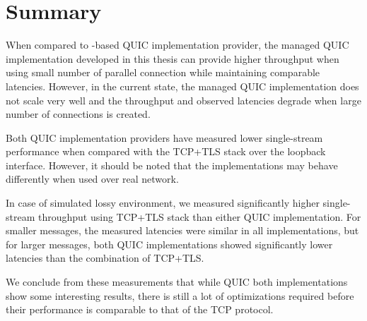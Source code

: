\section{Summary}


When compared to \libmsquic{}-based QUIC implementation provider, the managed QUIC implementation
developed in this thesis can provide higher throughput when using small number of parallel
connection while maintaining comparable latencies. However, in the current state, the managed QUIC
implementation does not scale very well and the throughput and observed latencies degrade when large
number of connections is created.

Both QUIC implementation providers have measured lower single-stream performance when compared with
the TCP+TLS stack over the loopback interface. However, it should be noted that the implementations
may behave differently when used over real network.

In case of simulated lossy environment, we measured significantly higher single-stream throughput
using TCP+TLS stack than either QUIC implementation. For smaller messages, the measured latencies
were similar in all implementations, but for larger messages, both QUIC implementations showed
significantly lower latencies than the combination of TCP+TLS\@.

We conclude from these measurements that while QUIC both implementations show some interesting
results, there is still a lot of optimizations required before their performance is comparable to
that of the TCP protocol.
